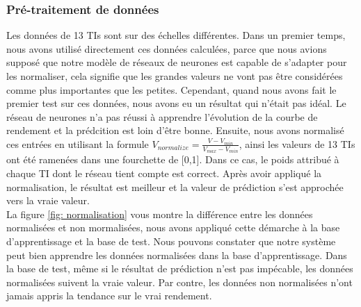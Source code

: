 \subsubsection{Pré-traitement de données}

Les données de 13 TIs sont sur des échelles différentes. Dans un premier temps, nous avons utilisé directement ces données calculées, parce que nous avions supposé que notre modèle de réseaux de neurones est capable de s'adapter pour les normaliser, cela signifie que les grandes valeurs ne vont pas être considérées comme plus importantes que les petites. Cependant, quand nous avons fait le premier test sur ces données, nous avons eu un résultat qui n’était pas idéal. Le réseau de neurones n'a pas réussi à apprendre l'évolution de la courbe de rendement et la prédcition est loin d'être bonne. Ensuite, nous avons normalisé ces entrées en utilisant la formule $ V_{normalize} = \frac{V-V_{min}}{V_{max}-V_{min}}$, ainsi les valeurs de 13 TIs ont été ramenées dans une fourchette de [0,1]. Dans ce cas, le poids attribué à chaque TI dont le réseau tient compte est correct. Après avoir appliqué la normalisation, le résultat est meilleur et la valeur de prédiction s'est approchée vers la vraie valeur. \\

La figure \ref{fig: normalisation} vous montre la différence entre les données normalisées et non mormalisées, nous avons appliqué cette démarche à la base d'apprentissage et la base de test. Nous pouvons constater que notre système peut bien apprendre les données normalisées dans la base d'apprentissage. Dans la base de test, même si le résultat de prédiction n'est pas impécable, les données normalisées suivent la vraie valeur. Par contre, les données non normalisées n'ont jamais appris la tendance sur le vrai rendement. 

